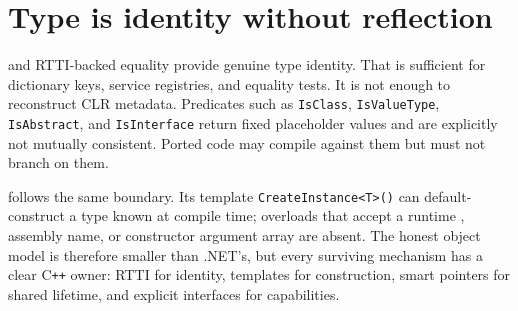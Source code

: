 \section{Type is identity without reflection}

 and RTTI-backed equality provide genuine type identity.
That is sufficient for dictionary keys, service registries, and equality tests. It is not
enough to reconstruct CLR metadata. Predicates such as \texttt{IsClass},
\texttt{IsValueType}, \texttt{IsAbstract}, and \texttt{IsInterface} return fixed placeholder
values and are explicitly not mutually consistent. Ported code may compile against them but
must not branch on them.

 follows the same boundary. Its template
\texttt{CreateInstance<T>()} can default-construct a type known at compile time; overloads
that accept a runtime , assembly name, or constructor argument array are absent.
The honest object model is therefore smaller than .NET's, but every surviving mechanism has a
clear C\texttt{++} owner: RTTI for identity, templates for construction, smart pointers for
shared lifetime, and explicit interfaces for capabilities.
